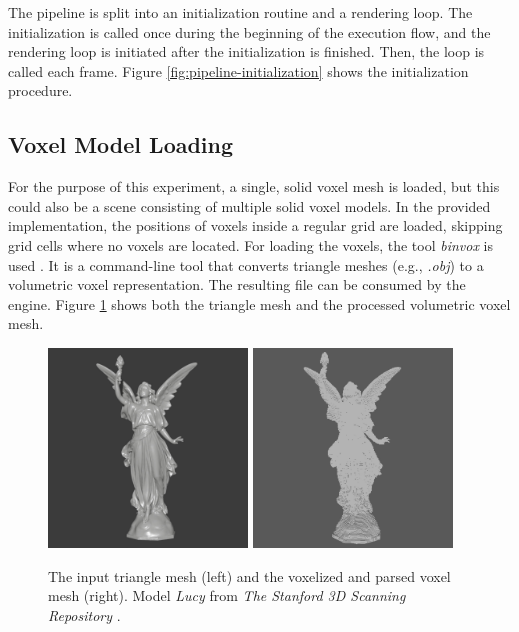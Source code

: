 \clearpage

\noindent
The pipeline is split into an initialization routine and a rendering loop. The initialization is called once during 
the beginning of the execution flow, and the rendering loop is initiated after the initialization is finished. Then, 
the loop is called each frame. Figure \ref{fig:pipeline-initialization} shows the initialization procedure. 

\subsection*{Voxel Model Loading} \label{subsec-voxel-model-loading}

For the purpose of this experiment, a single, solid voxel mesh is loaded, but this could also be a scene 
consisting of multiple solid voxel models. In the provided implementation, the positions of voxels inside a regular 
grid are loaded, skipping grid cells where no voxels are located. For loading the voxels, the tool \emph{binvox} 
is used \cite{binvox, Nooruddin2003}. It is a command-line tool that converts triangle meshes (e.g., \emph{.obj}) to 
a volumetric voxel representation. The resulting file can be consumed by the engine. Figure 
\ref{fig:trimesh-to-voxel-mesh} shows both the triangle mesh and the processed volumetric voxel mesh. 

\begin{figure}[h]
    \centering
    \includegraphics[width=200px]{images/graphics/lucy-triangle-mesh.jpg}
    \includegraphics[width=200px]{images/graphics/lucy-voxel-mesh.jpg}
    \caption{The input triangle mesh (left) and the voxelized and parsed voxel mesh (right). 
    Model \emph{Lucy} from \emph{The Stanford 3D Scanning Repository} \cite{Stanford23}.}
    \label{fig:trimesh-to-voxel-mesh}
\end{figure}


